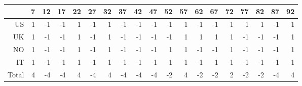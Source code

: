 \begin{tabular}{rrrrrrrrrrrrrrrrrrr}
  \hline
 & 7 & 12 & 17 & 22 & 27 & 32 & 37 & 42 & 47 & 52 & 57 & 62 & 67 & 72 & 77 & 82 & 87 & 92 \\ 
  \hline
US & 1 & -1 & -1 & 1 & -1 & 1 & -1 & -1 & -1 & -1 & 1 & -1 & -1 & 1 & 1 & 1 & -1 & 1 \\ 
  UK & 1 & -1 & -1 & 1 & -1 & 1 & -1 & -1 & -1 & -1 & 1 & 1 & 1 & 1 & -1 & -1 & -1 & 1 \\ 
  NO & 1 & -1 & -1 & 1 & -1 & 1 & -1 & -1 & -1 & 1 & 1 & -1 & -1 & 1 & -1 & -1 & -1 & 1 \\ 
  IT & 1 & -1 & -1 & 1 & -1 & 1 & -1 & -1 & -1 & -1 & 1 & -1 & -1 & -1 & -1 & -1 & -1 & 1 \\ 
  \hline
  Total & 4 & -4 & -4 & 4 & -4 & 4 & -4 & -4 & -4 & -2 & 4 & -2 & -2 & 2 & -2 & -2 & -4 & 4 \\ 
   \hline
\end{tabular}
